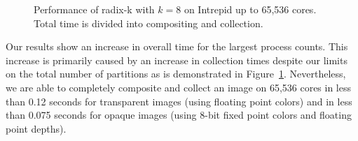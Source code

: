 \documentclass{sig-alternate}
\begin{document}
\begin{figure}[htbp]
  \centering
  \hfill
  \caption{Performance of radix-k with $k=8$ on Intrepid up to 65,536
    cores.  Total time is divided into compositing and collection.}
  \label{fig:ScalingCollect}
\end{figure}

Our results show an increase in overall time for the largest process
counts.  This increase is primarily caused by an increase in collection
times despite our limits on the total number of partitions as is
demonstrated in Figure~\ref{fig:ScalingCollect}.  Nevertheless, we are able
to completely composite and collect an image on 65,536 cores in less than
0.12 seconds for transparent images (using floating point colors) and in
less than 0.075 seconds for opaque images (using 8-bit fixed point colors
and floating point depths).
\end{document}
